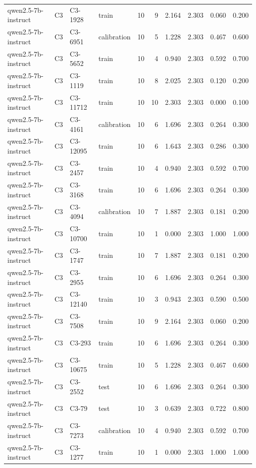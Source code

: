 \begin{table}
\begin{tabular}{llllrrrrrr}
qwen2.5-7b-instruct & C3 & C3-1928 & train & 10 & 9 & 2.164 & 2.303 & 0.060 & 0.200 \\
qwen2.5-7b-instruct & C3 & C3-6951 & calibration & 10 & 5 & 1.228 & 2.303 & 0.467 & 0.600 \\
qwen2.5-7b-instruct & C3 & C3-5652 & train & 10 & 4 & 0.940 & 2.303 & 0.592 & 0.700 \\
qwen2.5-7b-instruct & C3 & C3-1119 & train & 10 & 8 & 2.025 & 2.303 & 0.120 & 0.200 \\
qwen2.5-7b-instruct & C3 & C3-11712 & train & 10 & 10 & 2.303 & 2.303 & 0.000 & 0.100 \\
qwen2.5-7b-instruct & C3 & C3-4161 & calibration & 10 & 6 & 1.696 & 2.303 & 0.264 & 0.300 \\
qwen2.5-7b-instruct & C3 & C3-12095 & train & 10 & 6 & 1.643 & 2.303 & 0.286 & 0.300 \\
qwen2.5-7b-instruct & C3 & C3-2457 & train & 10 & 4 & 0.940 & 2.303 & 0.592 & 0.700 \\
qwen2.5-7b-instruct & C3 & C3-3168 & train & 10 & 6 & 1.696 & 2.303 & 0.264 & 0.300 \\
qwen2.5-7b-instruct & C3 & C3-4094 & calibration & 10 & 7 & 1.887 & 2.303 & 0.181 & 0.200 \\
qwen2.5-7b-instruct & C3 & C3-10700 & train & 10 & 1 & 0.000 & 2.303 & 1.000 & 1.000 \\
qwen2.5-7b-instruct & C3 & C3-1747 & train & 10 & 7 & 1.887 & 2.303 & 0.181 & 0.200 \\
qwen2.5-7b-instruct & C3 & C3-2955 & train & 10 & 6 & 1.696 & 2.303 & 0.264 & 0.300 \\
qwen2.5-7b-instruct & C3 & C3-12140 & train & 10 & 3 & 0.943 & 2.303 & 0.590 & 0.500 \\
qwen2.5-7b-instruct & C3 & C3-7508 & train & 10 & 9 & 2.164 & 2.303 & 0.060 & 0.200 \\
qwen2.5-7b-instruct & C3 & C3-293 & train & 10 & 6 & 1.696 & 2.303 & 0.264 & 0.300 \\
qwen2.5-7b-instruct & C3 & C3-10675 & train & 10 & 5 & 1.228 & 2.303 & 0.467 & 0.600 \\
qwen2.5-7b-instruct & C3 & C3-2552 & test & 10 & 6 & 1.696 & 2.303 & 0.264 & 0.300 \\
qwen2.5-7b-instruct & C3 & C3-79 & test & 10 & 3 & 0.639 & 2.303 & 0.722 & 0.800 \\
qwen2.5-7b-instruct & C3 & C3-7273 & calibration & 10 & 4 & 0.940 & 2.303 & 0.592 & 0.700 \\
qwen2.5-7b-instruct & C3 & C3-1277 & train & 10 & 1 & 0.000 & 2.303 & 1.000 & 1.000 \\

\end{tabular}
\end{table}
